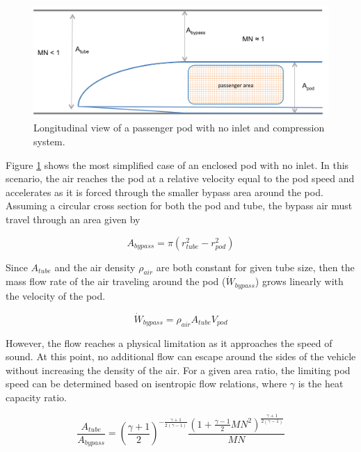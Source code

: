 \documentclass[heading.tex]{subfiles}
\begin{document}
\begin{figure}[hbtp]
\centering
\includegraphics[width=\textwidth]{images/closedCapsule.png}
\caption{Longitudinal view of a passenger pod with no inlet and compression system.}
\label{f:ClosedPod}
\end{figure}

Figure \ref{f:ClosedPod} shows the most simplified case of an enclosed pod with no inlet.
In this scenario, the air reaches the pod at a relative velocity equal to the pod speed
and accelerates as it is forced through the smaller bypass area around the pod.
Assuming a circular cross section for both the pod and tube, the bypass air must travel through an area given by

\begin{equation*}
A_{bypass} = \pi(r_{tube}^2-r_{pod}^2)
\end{equation*}

Since $A_{tube}$ and the air density $\rho_{air}$ are both constant for given tube size, then the mass
flow rate of the air traveling around the pod ($\dot{W}_{bypass}$) grows linearly with the velocity of the pod.

\begin{equation*}
\dot{W}_{bypass} = \rho_{air} A_{tube} V_{pod}
\end{equation*}

However, the flow reaches a physical limitation as it approaches the speed of sound. At this point, no additional flow can escape
around the sides of the vehicle without increasing the density of the air.
For a given area ratio, the limiting pod speed can be determined based on isentropic flow relations, where $\gamma$ is the heat capacity ratio.

\begin{equation*}
\frac{A_{tube}}{A_{bypass}} = \left(\frac{\gamma+1}{2}\right)^{-\frac{\gamma+1}{2\left(\gamma-1\right)}}\frac{\left(1+\frac{\gamma-1}{2}MN^{2}\right)^{\frac{\gamma+1}{2\left(\gamma-1\right)}}}{MN}
\end{equation*}
\end{document}
